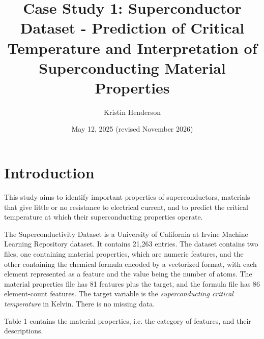 \documentclass{article}
\title{Case Study 1: Superconductor Dataset - Prediction of Critical Temperature and Interpretation of Superconducting Material Properties}
\author{Kristin Henderson}
\date{May 12, 2025 (revised November 2026)}    %
\begin{document}

\maketitle                   %

\section{Introduction}       %

This study aims to identify important properties of superconductors, materials that give little or no resistance to electrical current, and to predict the critical temperature at which their superconducting properties operate.

The Superconductivity Dataset is a University of California at Irvine Machine Learning Repository dataset. It contains 21,263 entries. The dataset contains two files, one containing material properties, which are numeric features, and the other containing the chemical formula encoded by a vectorized format, with each element represented as a feature and the value being the number of atoms. The material properties file has 81 features plus the target, and the formula file has 86 element-count features. The target variable is the \emph{superconducting critical temperature} in Kelvin. There is no missing data.

Table 1 contains the material properties, i.e. the category of features, and their descriptions.
\end{document}
